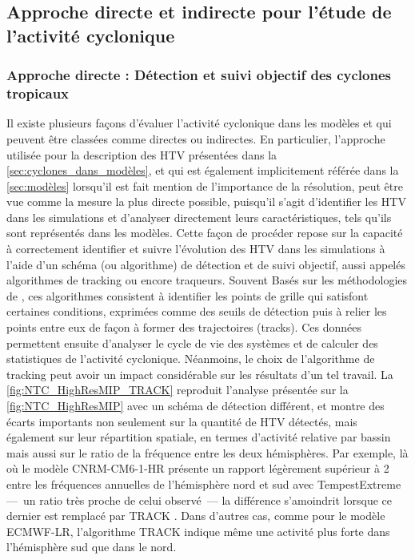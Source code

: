 \documentclass[../main.tex]{subfiles}
\begin{document}
\subsection{Approche directe et indirecte pour l'étude de l'activité cyclonique}\label{sec:tracking_vs_indices}

\subsubsection{Approche directe : Détection et suivi objectif des cyclones tropicaux}\label{sec:intro_tracking}

Il existe plusieurs façons d'évaluer l'activité cyclonique dans les modèles et qui peuvent être classées comme directes ou indirectes. En particulier,
l'approche utilisée pour la description des HTV présentées dans la \cref{sec:cyclones_dans_modèles}, et qui est également implicitement référée dans la
\cref{sec:modèles} lorsqu'il est fait mention de l'importance de la résolution, peut être vue comme la mesure la plus directe possible, puisqu'il s'agit
d'identifier les HTV dans les simulations et d'analyser directement leurs caractéristiques, tels qu'ils sont représentés dans les modèles. Cette façon de
procéder repose sur la capacité à correctement identifier et suivre l'évolution des HTV dans les simulations à l'aide d'un schéma (ou algorithme) de détection
et de suivi objectif, aussi appelés algorithmes de tracking ou encore traqueurs. Souvent Basés sur les méthodologies de
\textcite{haarsma_tropical_1993,bengtsson_hurricanetype_1995}, ces algorithmes consistent à identifier les points de grille qui satisfont certaines conditions,
exprimées comme des seuils de détection puis à relier les points entre eux de façon à former des trajectoires (tracks). Ces données permettent ensuite
d'analyser le cycle de vie des systèmes et de calculer des statistiques de l'activité cyclonique. Néanmoins, le choix de l'algorithme de tracking peut avoir un
impact considérable sur les résultats d'un tel travail. La \cref{fig:NTC_HighResMIP_TRACK} reproduit l'analyse présentée sur la \cref{fig:NTC_HighResMIP} avec
un schéma de détection différent, et montre des écarts importants non seulement sur la quantité de HTV détectés, mais également sur leur répartition spatiale,
en termes d'activité relative par bassin mais aussi sur le ratio de la fréquence entre les deux hémisphères. Par exemple, là où le modèle CNRM-CM6-1-HR présente
un rapport légèrement supérieur à \num{2} entre les fréquences annuelles de l'hémisphère nord et sud avec TempestExtreme
\parencite{ullrich_tempestextremes_2017,zarzycki_assessing_2017} ---~un ratio très proche de celui observé~--- la différence s'amoindrit lorsque ce dernier est
remplacé par TRACK \parencite{hodges_how_2017}. Dans d'autres cas, comme pour le modèle ECMWF-LR, l'algorithme TRACK indique même une activité plus forte dans
l'hémisphère sud que dans le nord.
\end{document}
